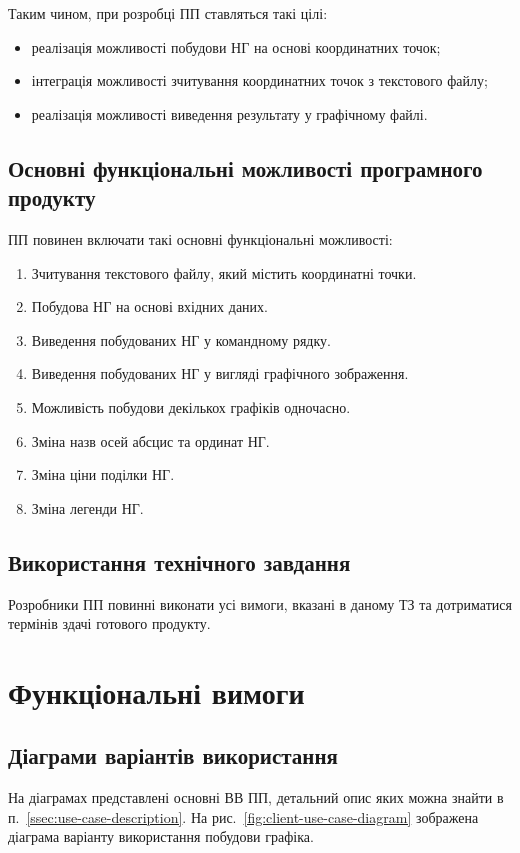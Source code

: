 \documentclass[a4paper,oneside,DIV=12,12pt]{scrartcl}
\begin{document}
			Таким чином, при розробці ПП ставляться такі цілі:
			\begin{itemize}
				\item реалізація можливості побудови НГ на основі координатних точок;
				\item інтеграція можливості зчитування координатних точок з текстового файлу;
				\item реалізація можливості виведення результату у графічному файлі.
			\end{itemize}

		\subsection{Основні функціональні можливості програмного продукту}

			ПП повинен включати такі основні функціональні можливості:
			\begin{enumerate}
				\item Зчитування текстового файлу, який містить координатні точки.
				\item Побудова НГ на основі вхідних даних.
				\item Виведення побудованих НГ у командному рядку.
				\item Виведення побудованих НГ у вигляді графічного зображення.
				\item Можливість побудови декількох графіків одночасно.
				\item Зміна назв осей абсцис та ординат НГ.
				\item Зміна ціни поділки НГ.
				\item Зміна легенди НГ.
			\end{enumerate}

		\subsection{Використання технічного завдання}

			Розробники ПП повинні виконати усі вимоги, вказані в даному ТЗ та дотриматися термінів здачі готового продукту.

	\section{Функціональні вимоги}
		\subsection{Діаграми варіантів використання}
		На діаграмах представлені основні ВВ ПП, детальний опис яких можна знайти в п.~\ref{ssec:use-case-description}. На рис.~\ref{fig:client-use-case-diagram} зображена діаграма варіанту використання побудови графіка.
		
\end{document}
